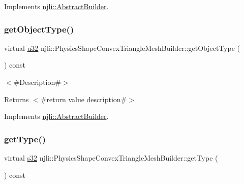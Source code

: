Implements \mbox{\hyperlink{classnjli_1_1_abstract_builder_a902f73ea78031b06aca183a417f3413b}{njli\+::\+Abstract\+Builder}}.

\mbox{\label{classnjli_1_1_physics_shape_convex_triangle_mesh_builder_a70cd9cc21ecfc663d38f225702878bdc}} 
\subsubsection{\texorpdfstring{get\+Object\+Type()}{getObjectType()}}
{\footnotesize\ttfamily virtual \mbox{\hyperlink{_util_8h_a10e94b422ef0c20dcdec20d31a1f5049}{u32}} njli\+::\+Physics\+Shape\+Convex\+Triangle\+Mesh\+Builder\+::get\+Object\+Type (\begin{DoxyParamCaption}{ }\end{DoxyParamCaption}) const\hspace{0.3cm}{\ttfamily [virtual]}}

$<$\#\+Description\#$>$

\begin{DoxyReturn}{Returns}
$<$\#return value description\#$>$ 
\end{DoxyReturn}


Implements \mbox{\hyperlink{classnjli_1_1_abstract_builder_a0f2d344fcf697b167f4f2b1122b5fb33}{njli\+::\+Abstract\+Builder}}.

\mbox{\label{classnjli_1_1_physics_shape_convex_triangle_mesh_builder_ad634d7d778ce6db1f63d1cc0cb77b965}} 
\subsubsection{\texorpdfstring{get\+Type()}{getType()}}
{\footnotesize\ttfamily virtual \mbox{\hyperlink{_util_8h_aa62c75d314a0d1f37f79c4b73b2292e2}{s32}} njli\+::\+Physics\+Shape\+Convex\+Triangle\+Mesh\+Builder\+::get\+Type (\begin{DoxyParamCaption}{ }\end{DoxyParamCaption}) const\hspace{0.3cm}{\ttfamily [virtual]}}


